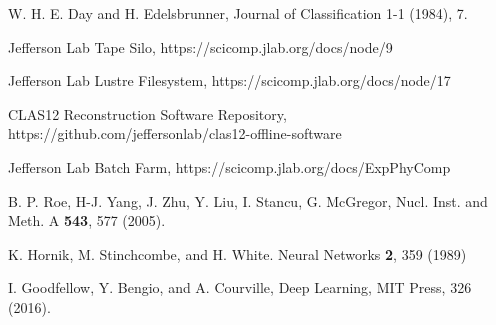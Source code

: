 \documentclass[3p,times,twocolumn]{elsarticle}
\begin{document}
\begin{thebibliography}{99}
W. H. E. Day and H. Edelsbrunner, Journal of Classification 1-1 (1984), 7. 

Jefferson Lab Tape Silo, https://scicomp.jlab.org/docs/node/9

Jefferson Lab Lustre Filesystem, https://scicomp.jlab.org/docs/node/17

CLAS12 Reconstruction Software Repository, https://github.com/jeffersonlab/clas12-offline-software

Jefferson Lab Batch Farm, https://scicomp.jlab.org/docs/ExpPhyComp

B. P. Roe, H-J. Yang, J. Zhu, Y. Liu, I. Stancu, G. McGregor, Nucl. Inst. and Meth. A {\bf 543}, 577 (2005).

K. Hornik, M. Stinchcombe, and H. White. Neural Networks {\bf 2}, 359 (1989)

I. Goodfellow, Y. Bengio, and A. Courville,  Deep Learning, MIT Press, 326 (2016).

\end{thebibliography}
\end{document}
